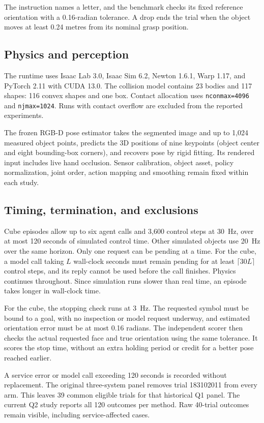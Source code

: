The instruction names a letter, and the benchmark checks its fixed reference orientation with a 0.16-radian tolerance. A drop ends the trial when the object moves at least 0.24 metres from its nominal grasp position.

\subsection{Physics and perception}
The runtime uses Isaac Lab 3.0, Isaac Sim 6.2, Newton 1.6.1, Warp 1.17, and PyTorch 2.11 with CUDA 13.0. The collision model contains 23 bodies and 117 shapes: 116 convex shapes and one box. Contact allocation uses \texttt{nconmax=4096} and \texttt{njmax=1024}. Runs with contact overflow are excluded from the reported experiments.

The frozen RGB-D pose estimator takes the segmented image and up to 1,024 measured object points, predicts the 3D positions of nine keypoints (object center and eight bounding-box corners), and recovers pose by rigid fitting. Its rendered input includes live hand occlusion. Sensor calibration, object asset, policy normalization, joint order, action mapping and smoothing remain fixed within each study.

\subsection{Timing, termination, and exclusions}
Cube episodes allow up to six agent calls and 3,600 control steps at 30~Hz, over at most 120 seconds of simulated control time. Other simulated objects use 20~Hz over the same horizon. Only one request can be pending at a time. For the cube, a model call taking $L$ wall-clock seconds must remain pending for at least $\lceil30L\rceil$ control steps, and its reply cannot be used before the call finishes. Physics continues throughout. Since simulation runs slower than real time, an episode takes longer in wall-clock time.

For the cube, the stopping check runs at 3~Hz. The requested symbol must be bound to a goal, with no inspection or model request underway, and estimated orientation error must be at most 0.16 radians. The independent scorer then checks the actual requested face and true orientation using the same tolerance. It scores the stop time, without an extra holding period or credit for a better pose reached earlier.

A service error or model call exceeding 120 seconds is recorded without replacement. The original three-system panel removes trial 183102011 from every arm. This leaves 39 common eligible trials for that historical Q1 panel. The current Q2 study reports all 120 outcomes per method. Raw 40-trial outcomes remain visible, including service-affected cases.

